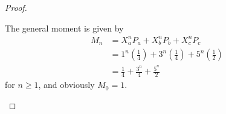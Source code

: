 \begin{proof}
\begin{parts}
	The general moment is given by
	 \begin{align*}
		M_n &= X_a^n P_a + X_b^n P_b + X_c^n P_c \\
		&= 1^n \left( \frac{1}{4} \right)+3^n \left( \frac{1}{4} \right) + 5^n\left( \frac{1}{2} \right)  \\
		&= \frac{1}{4}+ \frac{3^n}{4}+\frac{5^n}{2}
	\end{align*}
for $n\ge 1$, and obviously $M_0=1$.\qedhere
\end{parts}
\end{proof}
